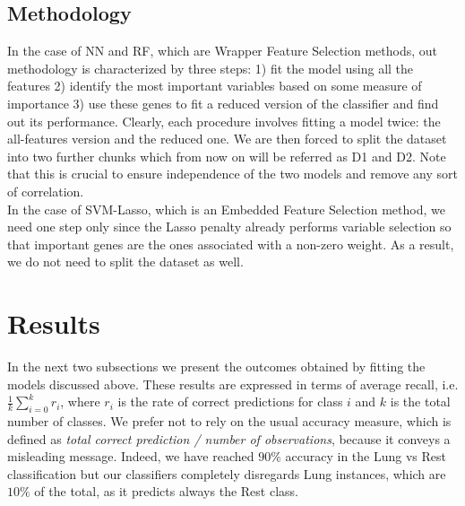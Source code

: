 \documentclass[a4paper,11pt, oneside]{article}  %
\begin{document}
\subsection{Methodology}
In the case of NN and RF,  which are Wrapper Feature Selection methods,  out methodology is characterized by three steps: 1) fit the model using all the features 2) identify the most important variables based on some measure of importance 3) use these genes to fit a reduced version of the classifier and find out its performance.
Clearly,  each procedure involves fitting a model twice: the all-features version and the reduced one.  We are then forced to split the dataset into two further chunks which from now on will be referred as D1 and D2.  Note that this is crucial to ensure independence of the two models and remove any sort of correlation.\\

In the case of SVM-Lasso, which is an Embedded Feature Selection method,  we need one step only since the Lasso penalty already	performs variable selection so that important genes are the ones associated with a non-zero weight.  As a result,  we do not need to split the dataset as well. 


\section{Results}
In the next two subsections we present the outcomes obtained by fitting the models discussed above. These results are expressed in terms of average recall,  i.e.  
$\frac{1}{k} \sum\limits_{i = 0 }^k r_i$,
where $r_i$ is the rate of correct predictions for class $i$ and $k$ is the total number of classes. We prefer not to rely on the usual accuracy measure,  which is defined as \textit{total correct prediction / number of observations}, because it conveys a misleading message.  Indeed,  we have reached $90\%$ accuracy in the Lung vs Rest classification but our classifiers completely disregards Lung instances, which are $10\%$ of the total,   as it predicts always the Rest class.  
\end{document}

